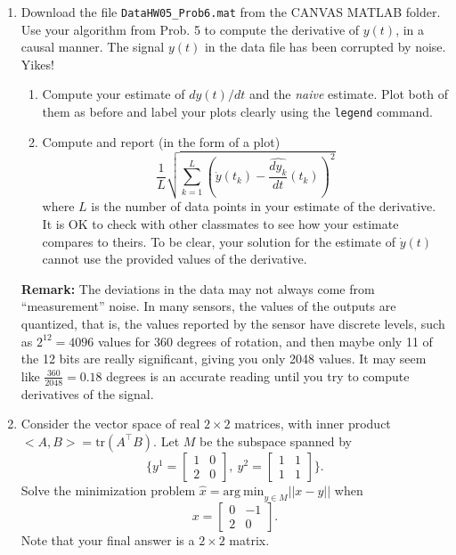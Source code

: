 \documentclass[letterpaper]{article}
\begin{document}
\begin{enumerate}
\begin{enumerate}
\end{enumerate}


\item Download the file \texttt{DataHW05\_Prob6.mat} from the CANVAS MATLAB folder. Use your algorithm from Prob. 5 to compute the derivative of $y(t)$, in a causal manner. The signal $y(t)$ in the data file has been corrupted by noise. Yikes!

    \begin{enumerate}
\setlength{\itemsep}{.1in}
\renewcommand{\labelenumi}{(\alph{enumi})}

    \item Compute your estimate of $dy(t)/dt$ and the \textit{naive} estimate. Plot both of them as before and label your plots clearly using the \texttt{legend} command.

        \item  Compute and report (in the form of a plot) $$\frac{1}{L} \sqrt{\sum_{k=1}^{L} \left(\dot{y}(t_k) - \widehat{\frac{dy_k}{dt}}(t_k) \right)^2} $$
            where $L$ is the number of data points in your estimate of the derivative. It is OK to check with other classmates to see how your estimate compares to theirs. To be clear, your solution for the estimate of $\dot{y}(t)$ cannot use the provided values of the derivative.

\end{enumerate}

 \textbf{Remark:} The deviations in the data may not always come from ``measurement'' noise. In many sensors, the values of the outputs are quantized, that is, the values reported by the sensor have discrete levels, such as $2^{12} = 4096$ values for 360 degrees of rotation, and then maybe only 11 of the 12 bits are really significant, giving you only 2048 values. It may seem like $\frac{360}{2048} = 0.18$ degrees is an accurate reading until you try to compute derivatives of the signal.



\item Consider the vector space of real $2 \times 2$ matrices, with inner product $<A,B>=\mathrm{tr}(A^\top B)$. Let $M$ be the subspace spanned by
    $$\{ y^1 = \left[ \begin{array}{cc} 1 & 0\\ 2 & 0 \end{array} \right],~   y^2 = \left[ \begin{array}{cc} 1 & 1\\ 1 & 1  \end{array}  \right] \}.$$
    Solve the minimization problem $\hat{x} = \mathrm{arg~min}_{y \in M} ||x-y||$ when
    $$ x = \left[ \begin{array}{rr} 0 & -1\\ 2 & 0  \end{array}  \right]. $$
    Note that your final answer is a $2 \times 2$ matrix.



\end{enumerate}
\end{document}
